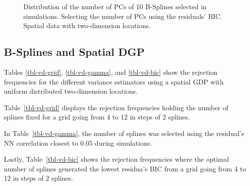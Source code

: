 \documentclass[
]{article}
\begin{document}
\begin{figure}

\begin{minipage}[t]{0.50\linewidth}

{\centering 


}

\end{minipage}%
%
\begin{minipage}[t]{0.50\linewidth}

{\centering 


}

\end{minipage}%

\caption{\label{fig-pc-bic-vd-spa}Distribution of the number of PCs of
10 B-Splines selected in simulations. Selecting the number of PCs using
the residuals' BIC. Spatial data with two-dimension locations.}

\end{figure}

\hypertarget{b-splines-and-spatial-dgp}{%
\subsection{B-Splines and Spatial DGP}\label{b-splines-and-spatial-dgp}}

Tables \ref{tbl-vd-grid}, \ref{tbl-vd-gamma}, and \ref{tbl-vd-bic} show
the rejection frequencies for the different variance estimators using a
spatial GDP with uniform distributed two-dimension locations.

Table~\ref{tbl-vd-grid} displays the rejection frequencies holding the
number of splines fixed for a grid going from 4 to 12 in steps of 2
splines.

In Table~\ref{tbl-vd-gamma}, the number of splines was selected using
the residual's NN correlation closest to 0.05 during simulations.

Lastly, Table~\ref{tbl-vd-bic} shows the rejection frequencies where the
optimal number of splines generated the lowest residua's BIC from
a grid going from 4 to 12 in steps of 2 splines.
\end{document}
